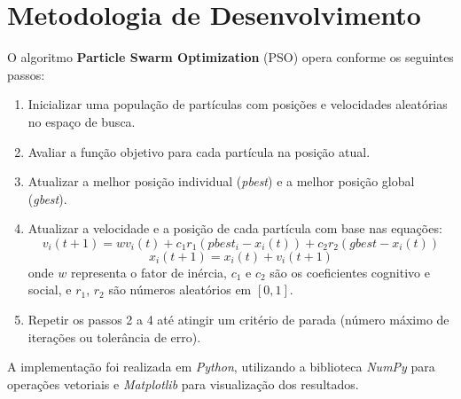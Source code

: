 \documentclass[12pt]{article}
\begin{document}
\section{Metodologia de Desenvolvimento}
\label{sec:metodologia_de_desenvolvimento}

O algoritmo \textbf{Particle Swarm Optimization} (PSO) opera conforme os seguintes passos:

\begin{enumerate}
  \item Inicializar uma população de partículas com posições e velocidades aleatórias no espaço de busca.
  \item Avaliar a função objetivo para cada partícula na posição atual.
  \item Atualizar a melhor posição individual (\textit{pbest}) e a melhor posição global (\textit{gbest}).
  \item Atualizar a velocidade e a posição de cada partícula com base nas equações:
    \begin{equation}
      v_{i}(t+1) = w v_{i}(t) + c_1 r_1 (pbest_{i} - x_{i}(t)) + c_2 r_2 (gbest - x_{i}(t))
    \end{equation}
    \begin{equation}
      x_{i}(t+1) = x_{i}(t) + v_{i}(t+1)
    \end{equation}
    onde $w$ representa o fator de inércia, $c_1$ e $c_2$ são os coeficientes cognitivo e social, e $r_1$, $r_2$ são números aleatórios em $[0,1]$.
  \item Repetir os passos 2 a 4 até atingir um critério de parada (número máximo de iterações ou tolerância de erro).
\end{enumerate}

A implementação foi realizada em \textit{Python}, utilizando a biblioteca \textit{NumPy} para operações vetoriais e \textit{Matplotlib} para visualização dos resultados.
\end{document}
